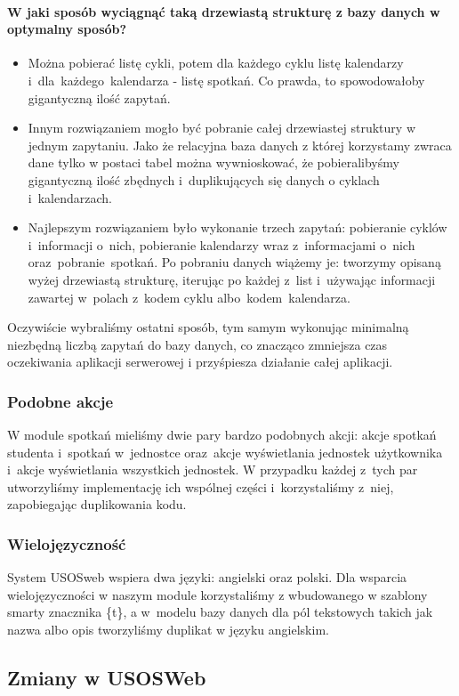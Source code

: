 \documentclass[licencjacka]{pracamgr}
\begin{document}
\paragraph{W jaki sposób wyciągnąć taką drzewiastą strukturę z bazy danych w optymalny sposób?}
\begin{itemize}
  \item
  Można pobierać listę cykli, potem dla każdego cyklu listę kalendarzy i~dla~każdego~kalendarza - listę spotkań. Co prawda, to spowodowałoby gigantyczną ilość zapytań.
  \item
  Innym rozwiązaniem mogło być pobranie całej drzewiastej struktury w jednym zapytaniu. Jako że relacyjna baza danych z której korzystamy zwraca dane tylko w postaci tabel można wywnioskować, że pobieralibyśmy gigantyczną ilość zbędnych i~duplikujących się danych o cyklach i~kalendarzach.
  \item
  Najlepszym rozwiązaniem było wykonanie trzech zapytań: pobieranie cyklów i~informacji o~nich, pobieranie kalendarzy wraz z~informacjami o~nich oraz~pobranie~spotkań. Po pobraniu danych wiążemy je: tworzymy opisaną wyżej drzewiastą strukturę, iterując po każdej z~list i~używając informacji zawartej w~polach z~kodem cyklu albo~kodem~kalendarza.
\end{itemize}
Oczywiście wybraliśmy ostatni sposób, tym samym wykonując minimalną niezbędną liczbą zapytań do bazy danych, co znacząco zmniejsza czas oczekiwania aplikacji serwerowej i przyśpiesza działanie całej aplikacji.

\subsubsection{Podobne akcje}
W module spotkań mieliśmy dwie pary bardzo podobnych akcji: akcje spotkań studenta i~spotkań w~jednostce oraz~akcje wyświetlania jednostek użytkownika i~akcje wyświetlania wszystkich jednostek. W przypadku każdej z~tych par utworzyliśmy implementację ich wspólnej części i~korzystaliśmy z~niej, zapobiegając duplikowania kodu.
\subsubsection{Wielojęzyczność}
System USOSweb wspiera dwa języki: angielski oraz polski. Dla wsparcia wielojęzyczności w naszym module korzystaliśmy z wbudowanego w szablony smarty znacznika \{t\}, a w~modelu bazy danych dla pól tekstowych takich jak nazwa albo opis tworzyliśmy duplikat w języku angielskim.
\subsection{Zmiany w USOSWeb}
\end{document}
